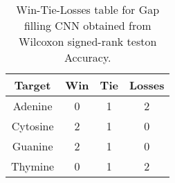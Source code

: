 \begin{table}[H]
\centering
\begin{tabular}{|c|c|c|c|}

\textbf{Target} &  \textbf{Win} &  \textbf{Tie} &  \textbf{Losses} \\
\hline

        Adenine &             0 &             1 &                2 \\
\hline
       Cytosine &             2 &             1 &                0 \\
\hline
        Guanine &             2 &             1 &                0 \\
\hline
        Thymine &             0 &             1 &                2 \\
\hline

\end{tabular}
\caption{Win-Tie-Losses table for Gap filling CNN obtained from Wilcoxon signed-rank teston Accuracy.}
\label{tab:gap_filling_cnn_nucleotides_comparison}
\end{table}